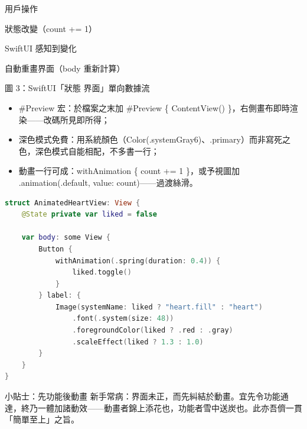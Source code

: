 用戶操作

狀態改變（count += 1）

SwiftUI 感知到變化

自動重畫界面（body 重新計算）

\begin{center}\small\color{gray}圖 3：SwiftUI「狀態 界面」單向數據流\end{center}


\begin{itemize}
  \item \#Preview 宏：於檔案之末加 \#Preview \{ ContentView() \}，右側畫布即時渲染——改碼所見即所得；
  \item 深色模式免費：用系統顏色（Color(.systemGray6)、.primary）而非寫死之色，深色模式自能相配，不多書一行；
  \item 動畫一行可成：withAnimation \{ count += 1 \}，或予視圖加 .animation(.default, value: count)——過渡絲滑。
\end{itemize}

\begin{lstlisting}[language=Swift]
struct AnimatedHeartView: View {
    @State private var liked = false

    var body: some View {
        Button {
            withAnimation(.spring(duration: 0.4)) {
                liked.toggle()
            }
        } label: {
            Image(systemName: liked ? "heart.fill" : "heart")
                .font(.system(size: 48))
                .foregroundColor(liked ? .red : .gray)
                .scaleEffect(liked ? 1.3 : 1.0)
        }
    }
}
\end{lstlisting}

\begin{tcbinfo}{小貼士：先功能後動畫}
新手常病：界面未正，而先糾結於動畫。宜先令功能通達，終乃一體加諸動效——動畫者錦上添花也，功能者雪中送炭也。此亦吾儕一貫「簡單至上」之旨。

\end{tcbinfo}

